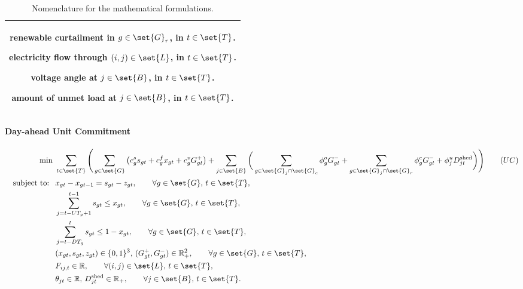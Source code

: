 \begin{table} [h]
\begin{tabular}{c}
\begin{minipage}{0.95\textwidth}
\begin{multicols}{2}
\begin{description}[labelwidth=\widthof{$D^{\text{shed}}_{jt}$:}]
\item[$\overgen_{gt}$:] renewable curtailment in $g \in \set{G}_r$, in $t \in \set{T}$.
\item[$F_{ij, t}$:] electricity flow through $(i, j) \in \set{L}$, in $t \in \set{T}$.
\item[$\theta_{jt}$:] voltage angle at $j \in \set{B}$, in $t \in \set{T}$.
\item[$D^{\text{shed}}_{jt}$:] amount of unmet load at $j \in \set{B}$, in $t \in \set{T}$.
\end{description}
\end{multicols} 
\end{minipage} \smallskip \\ 
\bottomrule
\end{tabular}
\caption{Nomenclature for the mathematical formulations.} \label{ch:td:tab:nomenclature}
\end{table}

\paragraph{Day-ahead Unit Commitment}

\begin{align}
&& \min ~ & \sum_{t \in \set{T}} \Bigg( \sum_{g \in \set{G}} \big( c_g^{s} s_{gt} + c_g^{f}x_{gt} + c_g^{v} \usedgen_{gt} \big) + \sum_{j \in \set{B}} \bigg( \sum_{g \in \set{G}_j\cap \set{G}_c}  \phi^{o}_g \overgen_{gt} + \sum_{g \in \set{G}_j\cap \set{G}_r}  \phi^{c}_g \overgen_{gt} + \phi^{u}_j D^{\text{shed}}_{jt} \bigg) \Bigg) \tag{$UC$} \label{ch:td:prob:duc} \\ 
&& \text{subject to: } ~ & x_{gt} - x_{gt-1}  = s_{gt} - z_{gt}, \qquad \forall g \in \set{G}, \, t \in \set{T}, \\
&&& \sum_{j=t-UT_g+1}^{t-1} s_{gt} \leq x_{gt}, \qquad \forall g \in \set{G},\, t \in \set{T}, \\ 
&&&  \sum_{j=t-DT_g}^{t} s_{gt} \leq 1-x_{gt}, \qquad \forall g \in \set{G}, \, t \in \set{T}, \\ 
&& &(x_{gt}, s_{gt}, z_{gt}) \in \binary^{3}, \, (\usedgen_{gt}, \overgen_{gt}) \in \mathbb{R}_+^2, \qquad \forall g \in \set{G},  \, t \in \set{T}, \nonumber \\ 
&&& F_{ij, t} \in \mathbb{R}, \qquad \forall (i,j) \in \set{L}, \, t \in \set{T}, \nonumber \\ 
&&& \theta_{jt} \in \mathbb{R},\, D^{\text{shed}}_{jt} \in \mathbb{R}_+, \qquad \forall j \in \set{B}, \, t \in \set{T}. \nonumber
\end{align}

















